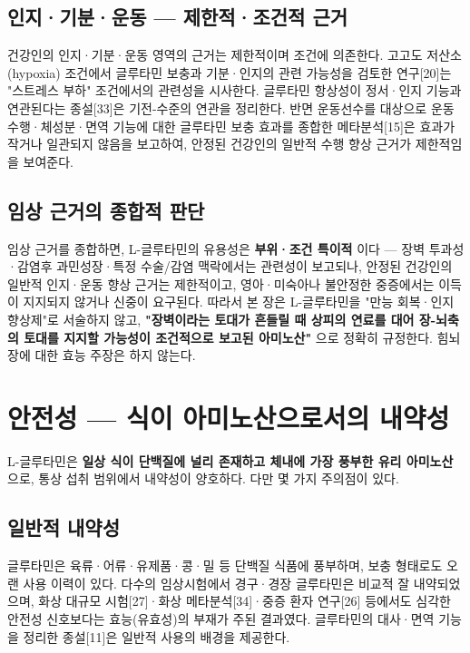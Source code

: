 \documentclass[11pt,oneside]{book}
\begin{document}
\subsection{인지·기분·운동 — 제한적·조건적 근거}
건강인의 인지·기분·운동 영역의 근거는 제한적이며 조건에 의존한다. 고고도 저산소(hypoxia) 조건에서 글루타민 보충과 기분·인지의 관련 가능성을 검토한 연구[20]는 "스트레스 부하" 조건에서의 관련성을 시사한다. 글루타민 항상성이 정서·인지 기능과 연관된다는 종설[33]은 기전-수준의 연관을 정리한다. 반면 운동선수를 대상으로 운동 수행·체성분·면역 기능에 대한 글루타민 보충 효과를 종합한 메타분석[15]은 효과가 작거나 일관되지 않음을 보고하여, 안정된 건강인의 일반적 수행 향상 근거가 제한적임을 보여준다.

\subsection{임상 근거의 종합적 판단}
임상 근거를 종합하면, L-글루타민의 유용성은 \textbf{부위·조건 특이적} 이다 — 장벽 투과성·감염후 과민성장·특정 수술/감염 맥락에서는 관련성이 보고되나, 안정된 건강인의 일반적 인지·운동 향상 근거는 제한적이고, 영아·미숙아나 불안정한 중증에서는 이득이 지지되지 않거나 신중이 요구된다. 따라서 본 장은 L-글루타민을 "만능 회복·인지 향상제"로 서술하지 않고, \textbf{"장벽이라는 토대가 흔들릴 때 상피의 연료를 대어 장-뇌축의 토대를 지지할 가능성이 조건적으로 보고된 아미노산"} 으로 정확히 규정한다. 힘뇌장에 대한 효능 주장은 하지 않는다.

\section{안전성 — 식이 아미노산으로서의 내약성}
L-글루타민은 \textbf{일상 식이 단백질에 널리 존재하고 체내에 가장 풍부한 유리 아미노산} 으로, 통상 섭취 범위에서 내약성이 양호하다. 다만 몇 가지 주의점이 있다.

\subsection{일반적 내약성}
글루타민은 육류·어류·유제품·콩·밀 등 단백질 식품에 풍부하며, 보충 형태로도 오랜 사용 이력이 있다. 다수의 임상시험에서 경구·경장 글루타민은 비교적 잘 내약되었으며, 화상 대규모 시험[27]·화상 메타분석[34]·중증 환자 연구[26] 등에서도 심각한 안전성 신호보다는 효능(유효성)의 부재가 주된 결과였다. 글루타민의 대사·면역 기능을 정리한 종설[11]은 일반적 사용의 배경을 제공한다.
\end{document}
